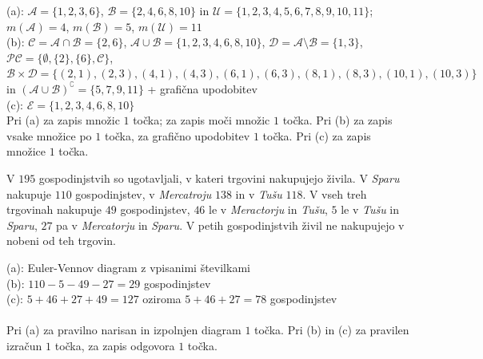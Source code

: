 \documentclass[addpoints]{exam}
\begin{document}
\begin{questions}
    \begin{solution}[12cm]
        (a): $\mathcal{A}=\{1,2,3,6\}$, $\mathcal{B}=\{2,4,6,8,10\}$ in $\mathcal{U}=\{1,2,3,4,5,6,7,8,9,10,11\}$; $m(\mathcal{A})=4$, $m(\mathcal{B})=5$, $m(\mathcal{U})=11$  \\
        (b): $\mathcal{C}=\mathcal{A}\cap\mathcal{B}=\{2,6\}$, $\mathcal{A}\cup\mathcal{B}=\{1,2,3,4,6,8,10\}$, $\mathcal{D}=\mathcal{A}\setminus\mathcal{B}=\{1,3\}$, $\mathcal{PC}=\{\emptyset,\{2\},\{6\},\mathcal{C}\}$, $\mathcal{B}\times\mathcal{D}=\{(2,1),(2,3),(4,1),(4,3),(6,1),(6,3),(8,1),(8,3),(10,1),(10,3)\}$ in $(\mathcal{A}\cup\mathcal{B})^\complement=\{5,7,9,11\}$ + grafična upodobitev\\
        (c): $\mathcal{E}=\{1,2,3,4,6,8,10\}$ \\
        Pri (a) za zapis množic $1$ točka; za zapis moči množic $1$ točka. Pri (b) za zapis vsake množice po $1$ točka, za grafično upodobitev $1$ točka. Pri (c) za zapis množice $1$ točka.
    \end{solution}






      \newpage
    \question
    V $195$ gospodinjstvih so ugotavljali, v kateri trgovini nakupujejo živila. V \textit{Sparu} nakupuje $110$ gospodinjstev, v \textit{Mercatroju} $138$ in v \textit{Tušu} $118$.
    V vseh treh trgovinah nakupuje $49$ gospodinjstev, $46$ le v \textit{Meractorju} in \textit{Tušu}, $5$ le v \textit{Tušu} in \textit{Sparu}, $27$ pa v \textit{Mercatorju} in \textit{Sparu}. 
    V petih gospodinjstvih živil ne nakupujejo v nobeni od teh trgovin.

    \begin{solution}[8.5cm]
        (a): Euler-Vennov diagram z vpisanimi številkami \\
        (b): $110-5-49-27=29$ gospodinjstev\\
        (c): $5+46+27+49=127$ oziroma $5+46+27=78$ gospodinjstev \\ \\
        Pri (a) za pravilno narisan in izpolnjen diagram $1$ točka. Pri (b) in (c) za pravilen izračun $1$ točka, za zapis odgovora $1$ točka.
    \end{solution}





\end{questions}
\end{document}
